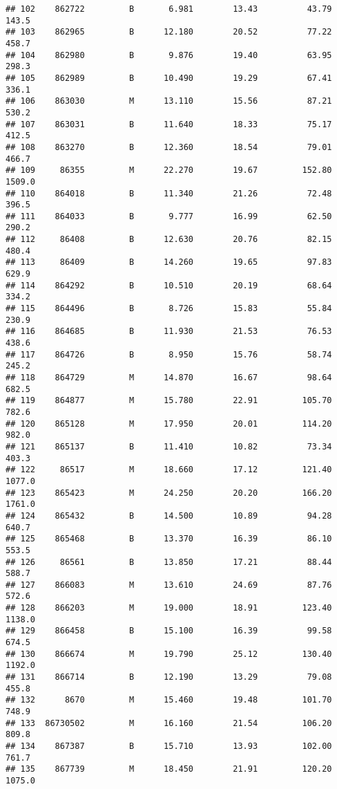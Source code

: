 \documentclass[
]{article}
\begin{document}
\begin{verbatim}
## 102    862722         B       6.981        13.43          43.79     143.5
## 103    862965         B      12.180        20.52          77.22     458.7
## 104    862980         B       9.876        19.40          63.95     298.3
## 105    862989         B      10.490        19.29          67.41     336.1
## 106    863030         M      13.110        15.56          87.21     530.2
## 107    863031         B      11.640        18.33          75.17     412.5
## 108    863270         B      12.360        18.54          79.01     466.7
## 109     86355         M      22.270        19.67         152.80    1509.0
## 110    864018         B      11.340        21.26          72.48     396.5
## 111    864033         B       9.777        16.99          62.50     290.2
## 112     86408         B      12.630        20.76          82.15     480.4
## 113     86409         B      14.260        19.65          97.83     629.9
## 114    864292         B      10.510        20.19          68.64     334.2
## 115    864496         B       8.726        15.83          55.84     230.9
## 116    864685         B      11.930        21.53          76.53     438.6
## 117    864726         B       8.950        15.76          58.74     245.2
## 118    864729         M      14.870        16.67          98.64     682.5
## 119    864877         M      15.780        22.91         105.70     782.6
## 120    865128         M      17.950        20.01         114.20     982.0
## 121    865137         B      11.410        10.82          73.34     403.3
## 122     86517         M      18.660        17.12         121.40    1077.0
## 123    865423         M      24.250        20.20         166.20    1761.0
## 124    865432         B      14.500        10.89          94.28     640.7
## 125    865468         B      13.370        16.39          86.10     553.5
## 126     86561         B      13.850        17.21          88.44     588.7
## 127    866083         M      13.610        24.69          87.76     572.6
## 128    866203         M      19.000        18.91         123.40    1138.0
## 129    866458         B      15.100        16.39          99.58     674.5
## 130    866674         M      19.790        25.12         130.40    1192.0
## 131    866714         B      12.190        13.29          79.08     455.8
## 132      8670         M      15.460        19.48         101.70     748.9
## 133  86730502         M      16.160        21.54         106.20     809.8
## 134    867387         B      15.710        13.93         102.00     761.7
## 135    867739         M      18.450        21.91         120.20    1075.0

\end{verbatim}
\end{document}
